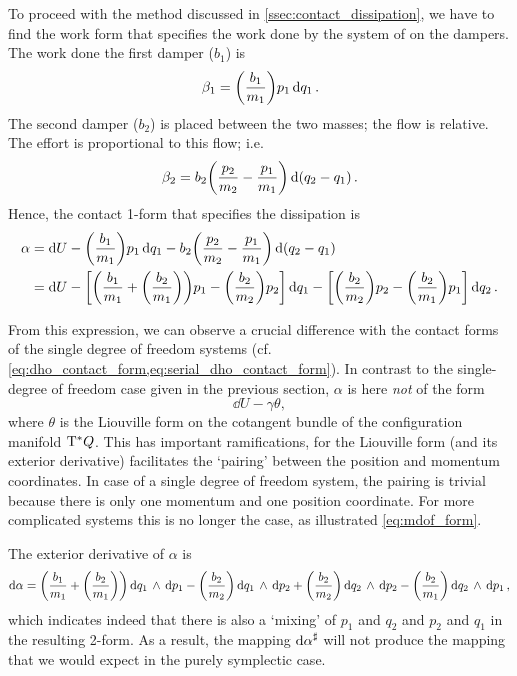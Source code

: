 To proceed with the method discussed in \cref{ssec:contact_dissipation}, we have to find the work form that specifies the work done by the system of on the dampers. The work done the first damper (\(b_1\)) is
\begin{equation}
     \beta_1 = \qty(\frac{b_1}{m_1})p_1\dd{q_1}.
\end{equation}
The second damper (\(b_2\)) is placed between the two masses; the flow is relative. The effort is proportional to this flow; i.e.
\begin{equation}
     \beta_2 = b_2\qty(\frac{p_2}{m_2} - \frac{p_1}{m_1})\dd{\qty(q_2 - q_1)}.
\end{equation}
Hence, the contact 1-form that specifies the dissipation is
\begin{equation}
    \begin{split}
        \alpha  &= \dd{U} - \qty(\frac{b_1}{m_1})p_1\dd{q_1} - b_2\qty(\frac{p_2}{m_2} - \frac{p_1}{m_1})\dd{\qty(q_2 - q_1)} \\
                &= \dd{U} - \qty[\qty(\frac{b_1}{m_1} + \qty(\frac{b_2}{m_1})) p_1 - \qty(\frac{b_2}{m_2})p_2]\dd{q_1}
                          - \qty[\qty(\frac{b_2}{m_2})p_2 - \qty(\frac{b_2}{m_1})p_1]\dd{q_2}.
    \end{split}
    \label{eq:mdof_form}
\end{equation}

From this expression, we can observe a crucial difference with the contact forms of the single degree of freedom systems (cf. \cref{eq:dho_contact_form,eq:serial_dho_contact_form}). In contrast to the single-degree of freedom case given in the previous section, \(\alpha\) is here \emph{not} of the form
\begin{equation}
     \dd{U} - \gamma \theta,
\end{equation}
where \(\theta\) is the Liouville form on the cotangent bundle of the configuration manifold \(\mathrm{T}^*Q\). This has important ramifications, for the Liouville form (and its exterior derivative) facilitates the `pairing' between the position and momentum coordinates. In case of a single degree of freedom system, the pairing is trivial because there is only one momentum and one position coordinate. For more complicated systems this is no longer the case, as illustrated \cref{eq:mdof_form}.

The exterior derivative of \(\alpha\) is
\begin{equation}
     \dd{\alpha} = \qty(\frac{b_1}{m_1} + \qty(\frac{b_2}{m_1}))  \dd{q_1}\,\wedge\,\dd{p_1} 
                  -\qty(\frac{b_2}{m_2}) \dd{q_1}\,\wedge\,\dd{p_2} 
                  + \qty(\frac{b_2}{m_2}) \dd{q_2}\,\wedge\,\dd{p_2} 
                  - \qty(\frac{b_2}{m_1}) \dd{q_2}\,\wedge\,\dd{p_1} ,
\end{equation}
which indicates indeed that there is also a `mixing' of \(p_1\) and \(q_2\) and \(p_2\) and \(q_1\) in the resulting 2-form. As a result, the mapping \( \dd{\alpha}^\sharp \) will not produce the mapping that we would expect in the purely symplectic case.


